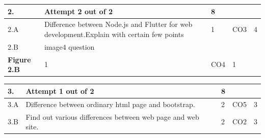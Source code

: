 \documentclass[12pt]{article}
\begin{document}
	\begin{tabular}{|L{1cm}|L{8cm}|C{1cm}|C{1cm}|C{1cm}|}\hline
	\bf2. & \bf{Attempt} \bf{2} \bf{out of} \bf{2} & \bf{8}  & & \\ \hline





		2.A &
	Difference between Node.js and Flutter for web development.Explain with certain few points \newline
			
	 &  1 & CO3 & 4\\ \hline
		2.B &
	image4 question \newline
			\begin{center}
		\includegraphics[width=4cm,height=3cm]{media/diagrams/image4.png}\\\bf{Figure }\bf2.B		
	\end{center}
		
	 &  1 & CO4 & 1\\ \hline
	\end{tabular}


\begin{tabular}{|L{1cm}|L{8cm}|C{1cm}|C{1cm}|C{1cm}|}\hline
	\bf3. & \bf{Attempt} \bf{1} \bf{out of} \bf{2} & \bf{8}  & & \\ \hline





		3.A &
	Difference between ordinary html page and bootstrap. \newline
			
	 &  2 & CO5 & 3\\ \hline
		3.B &
	Find out various differences between web page and web site. \newline
			
	 &  2 & CO2 & 3\\ \hline
	\end{tabular}
\end{document}
